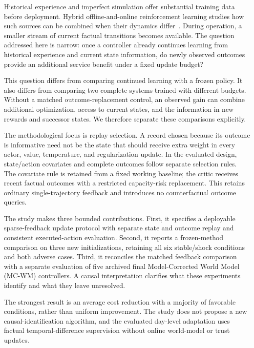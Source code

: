 \documentclass[journal]{IEEEtran}
\begin{document}
Historical experience and imperfect simulation offer substantial training data before deployment. Hybrid offline-and-online reinforcement learning studies how such sources can be combined when their dynamics differ~\cite{h2oplus}. During operation, a smaller stream of current factual transitions becomes available. The question addressed here is narrow: once a controller already continues learning from historical experience and current state information, do newly observed outcomes provide an additional service benefit under a fixed update budget?

This question differs from comparing continued learning with a frozen policy. It also differs from comparing two complete systems trained with different budgets. Without a matched outcome-replacement control, an observed gain can combine additional optimization, access to current states, and the information in new rewards and successor states. We therefore separate these comparisons explicitly.

The methodological focus is replay selection. A record chosen because its outcome is informative need not be the state that should receive extra weight in every actor, value, temperature, and regularization update. In the evaluated design, state/action covariates and complete outcomes follow separate selection rules. The covariate rule is retained from a fixed working baseline; the critic receives recent factual outcomes with a restricted capacity-risk replacement. This retains ordinary single-trajectory feedback and introduces no counterfactual outcome queries.

The study makes three bounded contributions. First, it specifies a deployable sparse-feedback update protocol with separate state and outcome replay and consistent executed-action evaluation. Second, it reports a frozen-method comparison on three new initializations, retaining all six stable/shock conditions and both adverse cases. Third, it reconciles the matched feedback comparison with a separate evaluation of five archived final Model-Corrected World Model (MC-WM) controllers. A causal interpretation clarifies what these experiments identify and what they leave unresolved.

The strongest result is an average cost reduction with a majority of favorable conditions, rather than uniform improvement. The study does not propose a new causal-identification algorithm, and the evaluated day-level adaptation uses factual temporal-difference supervision without online world-model or trust updates.
\end{document}
